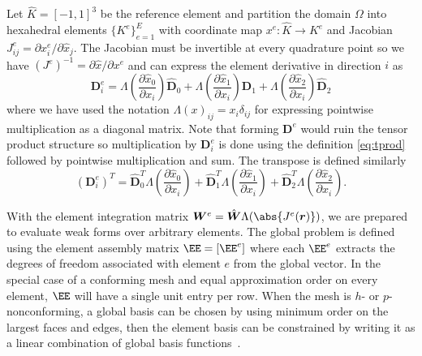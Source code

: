 Let $\hat K = [-1,1]^3$ be the reference element and partition the domain $\Omega$ into hexahedral elements
$\{K^e\}_{e=1}^E$ with coordinate map $x^e : \hat K \to K^e$ and Jacobian $J^e_{ij} = \partial x_i^e/\partial \hat x_j$.
The Jacobian must be invertible at every quadrature point so we have $(J^e)^{-1} = \partial \hat x/\partial x^e$ and can
express the element derivative in direction $i$ as
\begin{equation*}
  \bm D^e_i = \Lambda\left(\frac{\partial \hat x_0}{\partial x_i}\right) \hat{\bm D}_0
  + \Lambda\left(\frac{\partial \hat x_1}{\partial x_i}\right) \hat{\bm D}_1
  + \Lambda\left(\frac{\partial \hat x_2}{\partial x_i}\right) \hat{\bm D}_2
\end{equation*}
where we have used the notation $\Lambda(x)_{ij} = x_i \delta_{ij}$ for expressing pointwise multiplication as a
diagonal matrix.  Note that forming $\bm D^e$ would ruin the tensor product structure so multiplication by $\bm D^e_i$
is done using the definition \eqref{eq:tprod} followed by pointwise multiplication and sum.  The transpose is defined
similarly
\begin{equation*}
  (\bm D^e_i)^T = \hat{\bm D}_0^T \Lambda\left(\frac{\partial \hat x_0}{\partial x_i}\right)
  + \hat{\bm D}_1^T \Lambda\left(\frac{\partial \hat x_1}{\partial x_i}\right)
  + \hat{\bm D}_2^T \Lambda\left(\frac{\partial \hat x_2}{\partial x_i}\right) .
\end{equation*}

With the element integration matrix $\bm W^e = \hat{\bm W} \Lambda(\abs{J^e(\bm r)})$, we are prepared to evaluate weak
forms over arbitrary elements.  The global problem is defined using the element assembly matrix $\EE = [\EE^e]$ where
each $\EE^e$ extracts the degrees of freedom associated with element $e$ from the global vector.  In the special case of
a conforming mesh and equal approximation order on every element, $\EE$ will have a single unit entry per row.  When the
mesh is $h$- or $p$-nonconforming, a global basis can be chosen by using minimum order on the largest faces and edges,
then the element basis can be constrained by writing it as a linear combination of global basis
functions~\cite{demkowicz1989tuh}.

